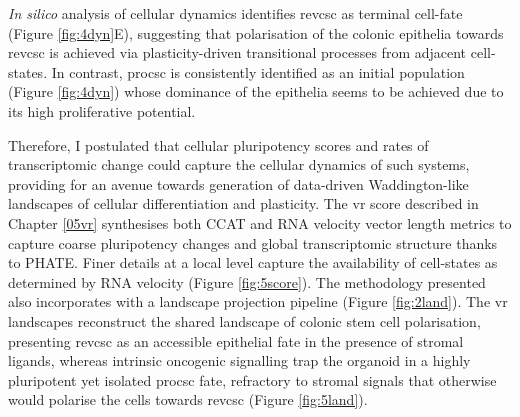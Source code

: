 \emph{In silico} analysis of cellular dynamics identifies \acrshort{revcsc} as terminal cell-fate (Figure \ref{fig:4dyn}E), suggesting that polarisation of the colonic epithelia towards \acrshort{revcsc} is achieved via plasticity-driven transitional processes from adjacent cell-states. In contrast, \acrshort{procsc} is consistently identified as an initial population (Figure \ref{fig:4dyn}) whose dominance of the epithelia seems to be achieved due to its high proliferative potential.

Therefore, I postulated that cellular pluripotency scores and rates of transcriptomic change could capture the cellular dynamics of such systems, providing for an avenue towards generation of data-driven Waddington-like landscapes of cellular differentiation and plasticity. The \acrfull{vr} score described in Chapter \ref{05vr} synthesises both CCAT and RNA velocity vector length metrics to capture coarse pluripotency changes and global transcriptomic structure thanks to PHATE. Finer details at a local level capture the availability of cell-states as determined by RNA velocity (Figure \ref{fig:5score}). The methodology presented also incorporates with a landscape projection pipeline (Figure \ref{fig:2land}). The \acrshort{vr} landscapes reconstruct the shared landscape of colonic stem cell polarisation, presenting \acrshort{revcsc} as an accessible epithelial fate in the presence of stromal ligands, whereas intrinsic oncogenic signalling trap the organoid in a highly pluripotent yet isolated \acrshort{procsc} fate, refractory to stromal signals that otherwise would polarise the cells towards \acrshort{revcsc} (Figure \ref{fig:5land}). 

